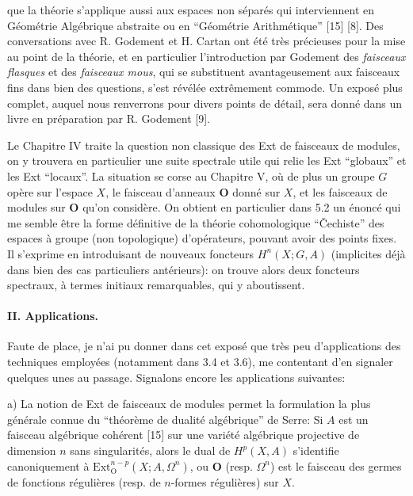 
que la théorie s'applique aussi aux espaces non séparés qui interviennent en
Géométrie Algébrique abstraite ou en ``Géométrie Arithmétique'' [15] [8]. Des
conversations avec R. Godement et H. Cartan ont été très précieuses pour la
mise au point de la théorie, et en particulier l'introduction par Godement des
\emph{faisceaux flasques} et des \emph{faisceaux mous}, qui se substituent
avantageusement aux faisceaux fins dans bien des questions, s'est révélée
extrêmement commode. Un exposé plus complet, auquel nous renverrons pour divers
points de détail, sera donné dans un livre en préparation par R. Godement [9].

Le Chapitre IV traite la question non classique des Ext de faisceaux de
modules, on y trouvera en particulier une suite spectrale utile qui relie les
Ext ``globaux'' et les Ext ``locaux''.
La situation se corse au Chapitre V, où de plus un groupe $G$ opère sur
l'espace $X$, le faisceau d'anneaux $\mathbf{O}$ donné sur $X$, et les faisceaux de
modules sur $\mathbf{O}$ qu'on considère. On obtient en particulier dans 5.2 un énoncé
qui me semble être la forme définitive de la théorie cohomologique
``Čechiste'' des espaces à groupe (non topologique) d'opérateurs, pouvant avoir
des points fixes. Il s'exprime en introduisant de nouveaux foncteurs
$H^n(X;G,A)$ (implicites déjà dans bien des cas particuliers antérieurs): on
trouve alors deux foncteurs spectraux, à termes initiaux remarquables, qui y
aboutissent.

\paragraph{II. Applications.}
Faute de place, je n'ai pu donner dans cet exposé que très peu d'applications
des techniques employées (notamment dans 3.4 et 3.6), me contentant d'en
signaler quelques unes au passage. Signalons encore les applications
suivantes:

\par a)
La notion de Ext de faisceaux de modules permet la formulation la plus
générale connue du ``théorème de dualité algébrique'' de Serre: Si $A$ est un
faisceau algébrique cohérent [15] sur une variété algébrique projective de
dimension $n$ sans singularités, alors le dual de $H^p(X,A)$ s'identifie
canoniquement à $\mathrm{Ext}_{\mathrm{O}}^{n-p}(X;A,\Omega^n)$, ou $\mathbf{O}$ (resp.
$\Omega^n$) est le faisceau des germes de fonctions régulières (resp. de
$n$-formes régulières) sur $X$.

